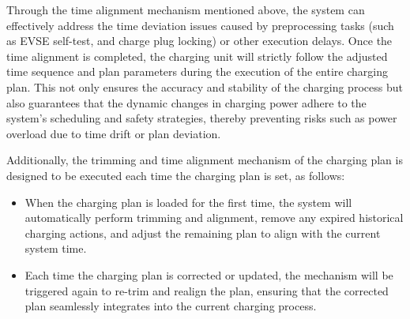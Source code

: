 \documentclass[
	english,
	ruledheaders=section,%
	class=report,%
	thesis={type=Report},%
	accentcolor=9c,%
	custommargins=true,%
	marginpar=false,%
	parskip=half-,%
	fontsize=11pt,%
	logofile={img/tuda_logo.pdf}, %
]{tudapub}
\begin{document}
Through the time alignment mechanism mentioned above, the system can effectively address the time deviation issues caused by preprocessing tasks (such as EVSE self-test, and charge plug locking) or other execution delays. Once the time alignment is completed, the charging unit will strictly follow the adjusted time sequence and plan parameters during the execution of the entire charging plan. This not only ensures the accuracy and stability of the charging process but also guarantees that the dynamic changes in charging power adhere to the system’s scheduling and safety strategies, thereby preventing risks such as power overload due to time drift or plan deviation.


Additionally, the trimming and time alignment mechanism of the charging plan is designed to be executed each time the charging plan is set, as follows:

\begin{itemize}
    \item When the charging plan is loaded for the first time, the system will automatically perform trimming and alignment, remove any expired historical charging actions, and adjust the remaining plan to align with the current system time.
    \item Each time the charging plan is corrected or updated, the mechanism will be triggered again to re-trim and realign the plan, ensuring that the corrected plan seamlessly integrates into the current charging process.
\end{itemize}
\end{document}
